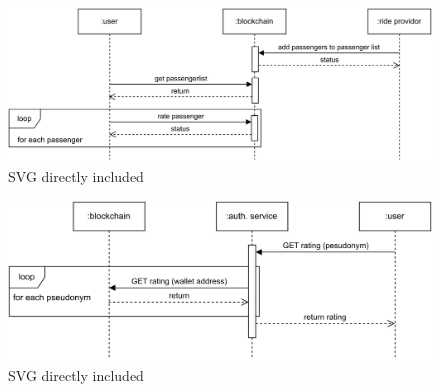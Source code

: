 \begin{figure}
    \centering
    \includegraphics[width=\linewidth]{data/8.svg}
    \caption{SVG directly included}
    \label{fig:directSVG}
\end{figure}


\begin{figure}
    \centering
    \includegraphics[width=\linewidth]{data/9.svg}
    \caption{SVG directly included}
    \label{fig:directSVG}
\end{figure}
